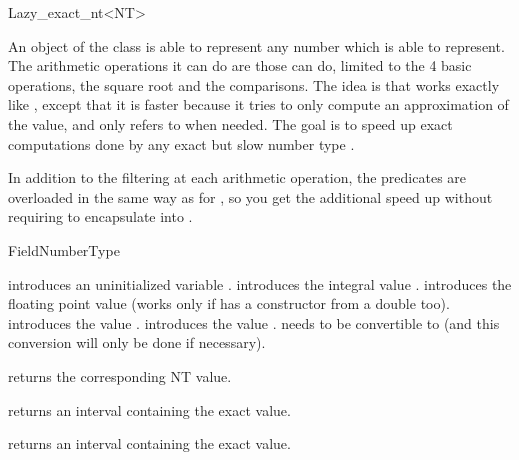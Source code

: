 
\begin{ccRefClass} {Lazy_exact_nt<NT>}
\label{lazy_exact_nt}

\ccDefinition
An object of the class  is able to represent any number
which  is able to represent.  The arithmetic operations it can do are
those  can do, limited to the 4 basic operations, the square root and
the comparisons.
The idea is that  works exactly like , except
that it is faster because it tries to only compute an approximation of the
value, and only refers to  when needed.  The goal is to speed up exact
computations done by any exact but slow number type .

In addition to the filtering at each arithmetic operation, the predicates
are overloaded in the same way as for , so you get the
additional speed up without requiring to encapsulate 
into .


\ccIsModel
FieldNumberType

\ccCreation
{}

{introduces an uninitialized variable \ccVar.}
\ccGlue
{}
{introduces the integral value .}
\ccGlue
{}
{introduces the floating point value  (works only if  has a
constructor from a double too).}
\ccGlue
{}
{introduces the value .}
\ccGlue
{}
{introduces the value .  needs to be convertible to 
(and this conversion will only be done if necessary).}

\ccOperations

 {returns the corresponding NT value.}

 {returns an interval containing the
exact value.}

 {returns an interval containing the 
exact value.}


\end{ccRefClass}
